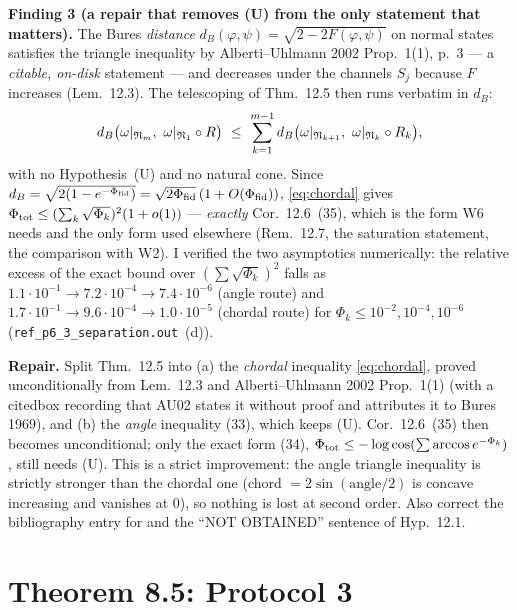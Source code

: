 \documentclass[11pt]{article}
\theoremstyle{definition}\newtheorem{example}[theorem]{Example}
\begin{document}
\textbf{Finding 3 (a repair that removes (U) from the only statement that matters).}
The Bures \emph{distance} $d_B(\varphi,\psi)=\sqrt{2-2F(\varphi,\psi)}$ on normal states
satisfies the triangle inequality by Alberti--Uhlmann 2002 Prop.~1(1), p.~3 --- a
\emph{citable, on-disk} statement --- and decreases under the channels $S_j$ because $F$
increases (Lem.~12.3).  The telescoping of Thm.~12.5 then runs verbatim in $d_B$:
\begin{equation}\label{eq:chordal}
 d_B\bigl(\omega|_{\mathfrak N_m},\ \omega|_{\mathfrak N_1}\circ R\bigr)\ \le\
 \sum_{k=1}^{m-1}d_B\bigl(\omega|_{\mathfrak N_{k+1}},\ \omega|_{\mathfrak N_k}\circ R_k\bigr),
\end{equation}
with no Hypothesis~(U) and no natural cone.  Since $d_B=\sqrt{2(1-e^{-\Phi_{\rm fid}})}
=\sqrt{2\Phi_{\rm fid}}\,(1+O(\Phi_{\rm fid}))$, \eqref{eq:chordal} gives
$\Phi_{\rm tot}\le(\sum_k\sqrt{\Phi_k})^2(1+o(1))$ --- \emph{exactly} Cor.~12.6~(35),
which is the form W6 needs and the only form used elsewhere (Rem.~12.7, the saturation
statement, the comparison with W2).  I verified the two asymptotics numerically: the
relative excess of the exact bound over $(\sum\sqrt{\Phi_k})^2$ falls as
$1.1\cdot10^{-1}\to7.2\cdot10^{-4}\to7.4\cdot10^{-6}$ (angle route) and
$1.7\cdot10^{-1}\to9.6\cdot10^{-4}\to1.0\cdot10^{-5}$ (chordal route) for
$\Phi_k\le10^{-2},10^{-4},10^{-6}$ (\texttt{ref\_p6\_3\_separation.out}~(d)).

\begin{verdictgap}
\textbf{Repair.}  Split Thm.~12.5 into (a) the \emph{chordal} inequality
\eqref{eq:chordal}, proved unconditionally from Lem.~12.3 and Alberti--Uhlmann 2002
Prop.~1(1) (with a citedbox recording that AU02 states it without proof and attributes it
to Bures 1969), and (b) the \emph{angle} inequality (33), which keeps (U).  Cor.~12.6~(35)
then becomes unconditional; only the exact form (34),
$\Phi_{\rm tot}\le-\log\cos(\sum\arccos e^{-\Phi_k})$, still needs (U).  This is a strict
improvement: the angle triangle inequality is strictly stronger than the chordal one
(chord $=2\sin(\text{angle}/2)$ is concave increasing and vanishes at $0$), so nothing is
lost at second order.  Also correct the bibliography entry for \cite{Uhl76} and the
``NOT OBTAINED'' sentence of Hyp.~12.1.
\end{verdictgap}

\section{Theorem 8.5: Protocol 3}\label{sec:thm85}
\end{document}
